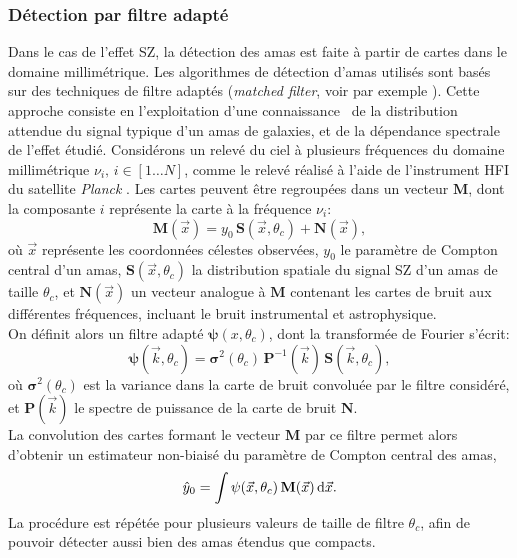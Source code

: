 \subsubsection{Détection par filtre adapté} %
Dans le cas de l'effet SZ, la détection des amas est faite à partir de cartes dans le domaine millimétrique.
Les algorithmes de détection d'amas utilisés sont basés sur des techniques de filtre adaptés (\textit{matched filter}, voir par exemple \cite{melin_catalog_2006, melin_comparison_2012, zubeldia_understanding_2021}).
Cette approche consiste en l'exploitation d'une connaissance \prior\ de la distribution attendue du signal typique d'un amas de galaxies, et de la dépendance spectrale de l'effet étudié.
Considérons un relevé du ciel à plusieurs fréquences du domaine millimétrique $\nu_i, \, i \in [1 \dots N]$, comme le relevé réalisé à l'aide de l'instrument HFI du satellite \textit{Planck} \cite{lamarre_planck_2010,planck_collaboration_planck_2020-1}.
Les cartes peuvent être regroupées dans un vecteur $\mathbf{M}$, dont la composante $i$ représente la carte à la fréquence $\nu_i$:
\begin{equation}
    \label{eq:matched_filter}
    \mathbf{M}(\vec{x}) = y_0 \, \mathbf{S}(\vec{x}, \theta_c) + \mathbf{N}(\vec{x}),
\end{equation}
où $\vec{x}$ représente les coordonnées célestes observées, $y_0$ le paramètre de Compton central d'un amas, $\mathbf{S}(\vec{x}, \theta_c)$ la distribution spatiale du signal SZ d'un amas de taille $\theta_c$, et $\mathbf{N}(\vec{x})$ un vecteur analogue à $\mathbf{M}$ contenant les cartes de bruit aux différentes fréquences, incluant le bruit instrumental et astrophysique\footnotemark. \\
On définit alors un filtre adapté $\mathbf{\psi}(x, \theta_c)$, dont la transformée de Fourier s'écrit:
\begin{equation}
    \label{eq:matched_filter_filter}
    \mathbf{\psi}(\vec{k}, \theta_c) = \mathbf{\sigma}^2(\theta_c) \, \mathbf{P}^{-1}(\vec{k}) \, \mathbf{S}(\vec{k}, \theta_c),
\end{equation}
où $\mathbf{\sigma}^2(\theta_c)$ est la variance dans la carte de bruit convoluée par le filtre considéré, et $\mathbf{P}(\vec{k})$ le spectre de puissance de la carte de bruit $\mathbf{N}$. \\
La convolution des cartes formant le vecteur $\mathbf{M}$ par ce filtre permet alors d'obtenir un estimateur non-biaisé du paramètre de Compton central des amas,
\begin{equation}
    \hat{y}_0 = \int \mathbf{\psi}(\vec{x}, \theta_c) \, \mathbf{M}(\vec{x}) \, \mathrm{d}\vec{x}.
\end{equation}
La procédure est répétée pour plusieurs valeurs de taille de filtre $\theta_c$, afin de pouvoir détecter aussi bien des amas étendus que compacts.

